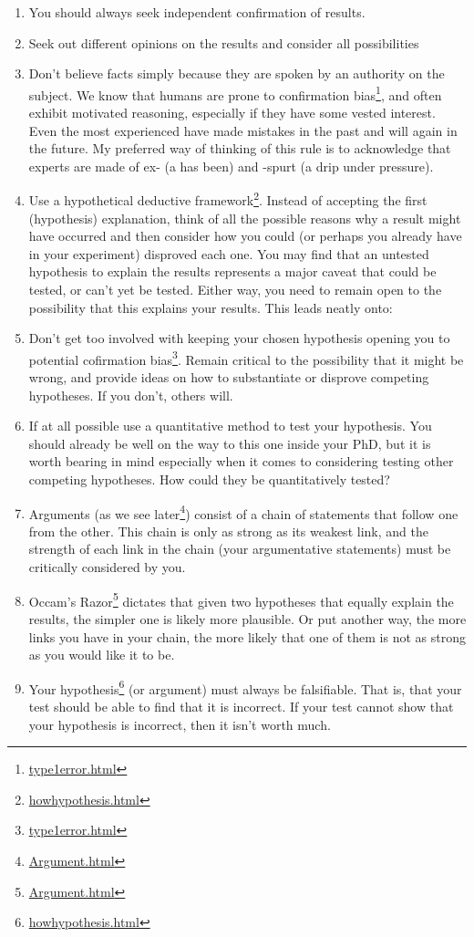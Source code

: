 \documentclass[
]{krantz}
\providecommand{\tightlist}{%
  \setlength{\itemsep}{0pt}\setlength{\parskip}{0pt}}
\renewcommand{\href}[2]{#2\footnote{\url{#1}}}
\begin{document}
\begin{enumerate}
\def\labelenumi{\arabic{enumi}.}
\tightlist
\item
  You should always seek independent confirmation of results.
\item
  Seek out different opinions on the results and consider all possibilities
\item
  Don't believe facts simply because they are spoken by an authority on the subject. We know that humans are prone to \href{type1error.html}{confirmation bias}, and often exhibit motivated reasoning, especially if they have some vested interest. Even the most experienced have made mistakes in the past and will again in the future. My preferred way of thinking of this rule is to acknowledge that experts are made of ex- (a has been) and -spurt (a drip under pressure).
\item
  \href{howhypothesis.html}{Use a hypothetical deductive framework}. Instead of accepting the first (hypothesis) explanation, think of all the possible reasons why a result might have occurred and then consider how you could (or perhaps you already have in your experiment) disproved each one. You may find that an untested hypothesis to explain the results represents a major caveat that could be tested, or can't yet be tested. Either way, you need to remain open to the possibility that this explains your results. This leads neatly onto:
\item
  Don't get too involved with keeping your chosen hypothesis \href{type1error.html}{opening you to potential cofirmation bias}. Remain critical to the possibility that it might be wrong, and provide ideas on how to substantiate or disprove competing hypotheses. If you don't, others will.
\item
  If at all possible use a quantitative method to test your hypothesis. You should already be well on the way to this one inside your PhD, but it is worth bearing in mind especially when it comes to considering testing other competing hypotheses. How could they be quantitatively tested?
\item
  Arguments (\href{Argument.html}{as we see later}) consist of a chain of statements that follow one from the other. This chain is only as strong as its weakest link, and the strength of each link in the chain (your argumentative statements) must be critically considered by you.
\item
  \href{Argument.html}{Occam's Razor} dictates that given two hypotheses that equally explain the results, the simpler one is likely more plausible. Or put another way, the more links you have in your chain, the more likely that one of them is not as strong as you would like it to be.
\item
  Your \href{howhypothesis.html}{hypothesis} (or argument) must always be falsifiable. That is, that your test should be able to find that it is incorrect. If your test cannot show that your hypothesis is incorrect, then it isn't worth much.
\end{enumerate}
\end{document}
